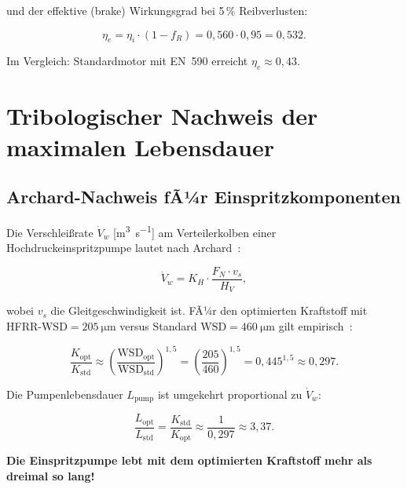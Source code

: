 ﻿\documentclass[12pt,a4paper]{article}
\newcommand{\WSD}{\ensuremath{\mathrm{WSD}}}
\begin{document}
und der effektive (brake) Wirkungsgrad bei 5\,\% Reibverlusten:

\begin{equation}
  \eta_e = \eta_i \cdot (1 - f_R) = 0{,}560 \cdot 0{,}95 = 0{,}532.
\end{equation}

Im Vergleich: Standardmotor mit EN~590 erreicht $\eta_e \approx 0{,}43$.

\section{Tribologischer Nachweis der maximalen Lebensdauer}
\label{sec:tribologie}

\subsection{Archard-Nachweis fÃ¼r Einspritzkomponenten}
\label{sec:tribologie_archard}

Die Verschlei\ss{}rate $\dot{V}_w$ [\si{\m\cubed\per\s}] am Verteilerkolben
einer Hochdruckeinspritzpumpe lautet nach Archard~\cite{archard1953}:

\begin{equation}
  \dot{V}_w = K_H \cdot \frac{F_N \cdot v_s}{H_V},
  \label{eq:vdot_archard}
\end{equation}

wobei $v_s$ die Gleitgeschwindigkeit ist. FÃ¼r den optimierten Kraftstoff
mit HFRR-$\WSD = \SI{205}{\micro\m}$ versus Standard $\WSD = \SI{460}{\micro\m}$
gilt empirisch~\cite{kerschbaumer2002}:

\begin{equation}
  \frac{K_{\mathrm{opt}}}{K_{\mathrm{std}}} \approx
  \left(\frac{\WSD_{\mathrm{opt}}}{\WSD_{\mathrm{std}}}\right)^{1{,}5}
  = \left(\frac{205}{460}\right)^{1{,}5} = 0{,}445^{1{,}5} \approx 0{,}297.
\end{equation}

Die Pumpenlebensdauer $L_{\mathrm{pump}}$ ist umgekehrt proportional zu $\dot{V}_w$:

\begin{equation}
  \frac{L_{\mathrm{opt}}}{L_{\mathrm{std}}} = \frac{K_{\mathrm{std}}}{K_{\mathrm{opt}}}
  \approx \frac{1}{0{,}297} \approx 3{,}37.
\end{equation}

\textbf{Die Einspritzpumpe lebt mit dem optimierten Kraftstoff mehr als
dreimal so lang!}
\end{document}
